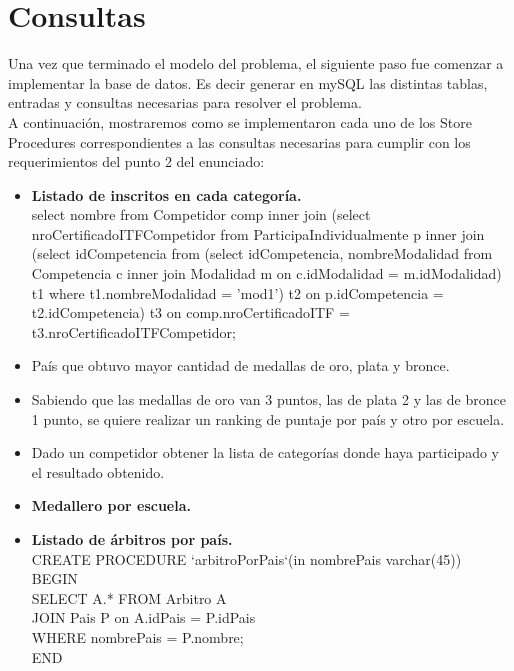\section{Consultas}
Una vez que terminado el modelo del problema, el siguiente paso fue comenzar a implementar la base de datos. Es decir generar en mySQL las distintas tablas, entradas y consultas necesarias para resolver el problema.\\

A continuación, mostraremos como se implementaron cada uno de los Store Procedures correspondientes a las consultas necesarias para cumplir con los requerimientos del punto 2 del enunciado:\\

\begin{itemize}
\item{\textbf{Listado de inscritos en cada categoría.}\\
select nombre from Competidor comp inner join 
(select nroCertificadoITFCompetidor 
from ParticipaIndividualmente p 
inner join (select idCompetencia from (select idCompetencia, nombreModalidad from Competencia c
inner join Modalidad m on c.idModalidad = m.idModalidad) t1 where t1.nombreModalidad = 'mod1') t2
on p.idCompetencia = t2.idCompetencia) t3 
on comp.nroCertificadoITF = t3.nroCertificadoITFCompetidor;

}

\item País que obtuvo mayor cantidad de medallas de oro, plata y bronce.
\item Sabiendo que las medallas de oro van 3 puntos, las de plata 2 y las de bronce 1 punto, se quiere realizar un ranking de puntaje por país y otro por escuela.
\item Dado un competidor obtener la lista de categorías donde haya participado y el resultado obtenido.

\item{ \textbf{Medallero por escuela.}\\
}
\item{\textbf{Listado de árbitros por país.}\\
CREATE PROCEDURE `arbitroPorPais`(in nombrePais varchar(45))\\
BEGIN\\
SELECT A.* FROM Arbitro A\\
	JOIN Pais P on A.idPais = P.idPais\\
    WHERE nombrePais = P.nombre;\\
END\\
}


\end{itemize}
